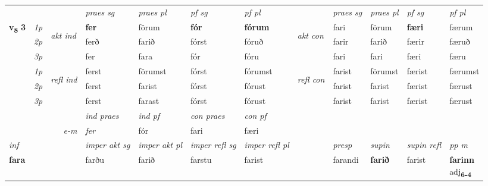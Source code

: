 \begin{longtable}[l]{X>{\footnotesize\itshape}llXXXXlXXXX}
 & &   & \textit{praes sg}  & \textit{praes pl}    & \textit{ pf sg} & \textit{pf pl} & & \textit{praes sg}  & \textit{praes pl}    & \textit{pf sg} & \textit{pf pl }  \\ \cmidrule{4-7} \cmidrule{9-12}
 \multirow{2}{*}{{{\textbf{v{\textsubscript{8}}} \Large{\textbf{3}}}}}  & 1p & \multirow{3}{*}{\begin{turn}{90}\textit{akt ind}\end{turn}} & \textbf{fer} & förum & \textbf{fór} & \textbf{fórum} & \multirow{3}{*}{\begin{turn}{90}\textit{akt con}\end{turn}} &fari & förum & \textbf{færi} & færum\\*
 & 2p &  &  ferð  & farið & fórst & fóruð & & farir & farið & færir & færuð \\*
 & 3p &  & fer & fara & fór & fóru & & fari & fari& færi & færu \\*
\cmidrule{4-7} \cmidrule{9-12}
 & 1p & \multirow{3}{*}{\begin{turn}{90}\textit{refl ind}\end{turn}}  & ferst & förumst & fórst & fórumst & \multirow{3}{*}{\begin{turn}{90}\textit{refl con}\end{turn}}  &farist & förumst & færist & færumst \\*
 & 2p &  & ferst & farist & fórst & fórust & &farist & farist & færist & færust \\*
 & 3p  & & ferst & farast & fórst & fórust & & farist & farist& færist & færust \\*
\cmidrule{4-7} \cmidrule{9-12}

   && &  \textit{ind praes} & \textit{ind pf} & \textit{con praes} & \textit{con pf} \\*
\multicolumn{3}{r}{\textit{e-m}} & fer & fór & fari & færi \\*

\cmidrule{4-7}
   {\textit{inf}} & &  & \textit{imper akt sg} & \textit{imper akt pl} & \textit{imper refl sg} & \textit{imper refl pl} && \textit{presp} & \textit{supin} & \textit{supin refl} & \textit{pp m} \\*
  {\textbf{fara}} & && farðu  & farið & farstu & farist && farandi &  \textbf{farið} & farist & \specialcell{\textbf{farinn} \\ adj\textbf{\textsubscript{6-4}}} \\*


\end{longtable}
